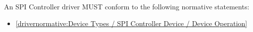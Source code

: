 \label{sec:Conformance / Driver Conformance / SPI Controller Driver Conformance}

An SPI Controller driver MUST conform to the following normative statements:

\begin{itemize}
\item \ref{drivernormative:Device Types / SPI Controller Device / Device Operation}
\end{itemize}

